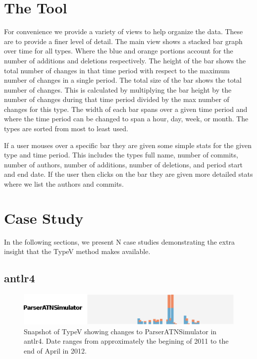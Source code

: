 \documentclass[conference]{IEEEtran}
\begin{document}
\section{The Tool}
For convenience we provide a variety of views to help organize the data. These are to provide a finer level of detail. The main view shows a stacked bar graph over time for all types. Where the blue and orange portions account for the number of additions and deletions respectively. The height of the bar shows the total number of changes in that time period with respect to the maximum number of changes in a single period.  The total size of the bar shows the total number of changes. This is calculated by multiplying the bar height by the number of changes during that time period divided by the max number of changes for this type. The width of each bar spans over a given time period and where the time period can be changed to span a hour, day, week, or month. The types are sorted from most to least used.

If a user mouses over a specific bar they are given some simple stats for the given type and time period. This includes the types full name, number of commits, number of authors, number of additions, number of deletions, and period start and end date. If the user then clicks on the bar they are given more detailed stats where we list the authors and commits.

\section{Case Study}

In the following sections, we present {N} case studies demonstrating the extra insight that the TypeV method makes available. 

\subsection{antlr4}

\begin{figure}[!ht]
\centering
\includegraphics[width=\columnwidth]{ParserATNSimulator}
\caption{Snapshot of TypeV showing changes to ParserATNSimulator in antlr4. Date ranges from approximately the begining of 2011 to the end of April in 2012.}
\label{fig:parser1}
\end{figure}
\end{document}
